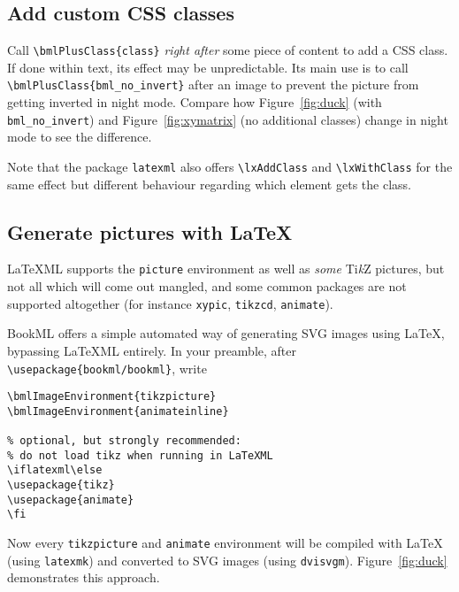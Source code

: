 \documentclass[a4paper,british]{article}
\def\tikzname{Ti\emph{k}Z}
\def\ltxinline{\lstinline[style=bookml]}
\begin{document}
\subsection{Add custom CSS classes}
Call \ltxinline|\bmlPlusClass{class}| \emph{right after} some piece of content to add a CSS class. If done within text, its effect may be unpredictable. Its main use is to call \ltxinline|\bmlPlusClass{bml_no_invert}| after an image to prevent the picture from getting inverted in night mode. Compare how Figure~\ref{fig:duck} (with \ltxinline|bml_no_invert|) and Figure~\ref{fig:xymatrix} (no additional classes) change in night mode to see the difference.

Note that the package \ltxinline|latexml| also offers \ltxinline|\lxAddClass| and \ltxinline|\lxWithClass| for the same effect but different behaviour regarding which element gets the class.

\subsection{Generate pictures with \LaTeX{}}
\label{sec:external-image}

LaTeXML supports the \ltxinline|picture| environment as well as \emph{some} \tikzname{} pictures, but not all which will come out mangled, and some common packages are not supported altogether (for instance \ltxinline|xypic|, \ltxinline|tikzcd|, \ltxinline|animate|).

BookML offers a simple automated way of generating SVG images using \LaTeX{}, bypassing LaTeXML entirely. In your preamble, after \ltxinline|\usepackage{bookml/bookml}|, write
\begin{lstlisting}[style=bookml]
\bmlImageEnvironment{tikzpicture}
\bmlImageEnvironment{animateinline}

% optional, but strongly recommended:
% do not load tikz when running in LaTeXML
\iflatexml\else
\usepackage{tikz}
\usepackage{animate}
\fi
\end{lstlisting}

Now every \ltxinline|tikzpicture| and \ltxinline|animate| environment will be compiled with \LaTeX{} (using \lstinline[frame=none]|latexmk|) and converted to SVG images (using \lstinline[frame=none]|dvisvgm|). Figure~\ref{fig:duck} demonstrates this approach.
\end{document}
